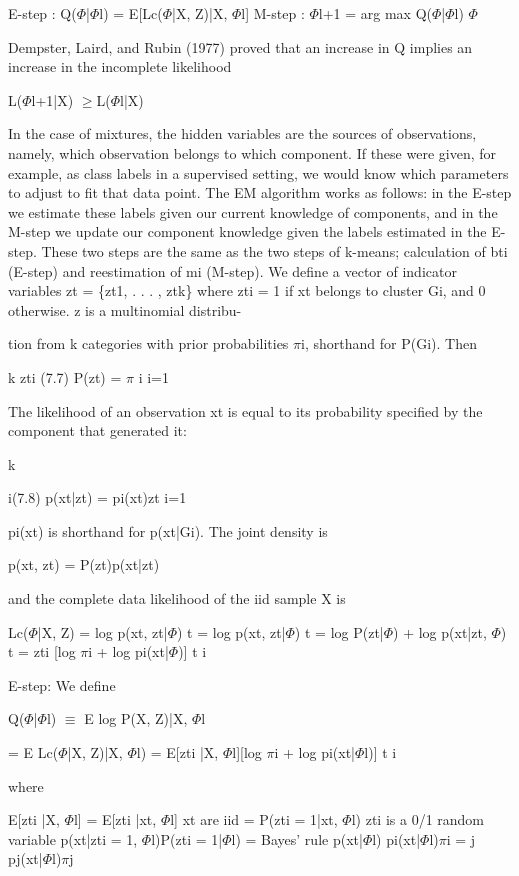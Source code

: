 E-step : Q($\Phi$|$\Phi$l) = E[Lc($\Phi$|X, Z)|X, $\Phi$l] M-step : $\Phi$l+1 = arg max Q($\Phi$|$\Phi$l) $\Phi$

Dempster, Laird, and Rubin (1977) proved that an increase in Q implies an increase in the incomplete likelihood

L($\Phi$l+1|X) $\geq$L($\Phi$l|X)

In the case of mixtures, the hidden variables are the sources of observations, namely, which observation belongs to which component. If these were given, for example, as class labels in a supervised setting, we would know which parameters to adjust to fit that data point. The EM algorithm works as follows: in the E-step we estimate these labels given our current knowledge of components, and in the M-step we update our component knowledge given the labels estimated in the E-step. These two steps are the same as the two steps of k-means; calculation of bti (E-step) and reestimation of mi (M-step). We define a vector of indicator variables zt = \{zt1, . . . , ztk\} where zti = 1 if xt belongs to cluster Gi, and 0 otherwise. z is a multinomial distribu-

tion from k categories with prior probabilities $\pi$i, shorthand for P(Gi). Then

k zti (7.7) P(zt) = $\pi$ i i=1

The likelihood of an observation xt is equal to its probability specified by the component that generated it:

k

i(7.8) p(xt|zt) = pi(xt)zt i=1

pi(xt) is shorthand for p(xt|Gi). The joint density is

p(xt, zt) = P(zt)p(xt|zt)

and the complete data likelihood of the iid sample X is

Lc($\Phi$|X, Z) = log p(xt, zt|$\Phi$) t = log p(xt, zt|$\Phi$) t = log P(zt|$\Phi$) + log p(xt|zt, $\Phi$) t = zti [log $\pi$i + log pi(xt|$\Phi$)] t i

E-step: We define

Q($\Phi$|$\Phi$l) $\equiv$ E log P(X, Z)|X, $\Phi$l

= E Lc($\Phi$|X, Z)|X, $\Phi$l) = E[zti |X, $\Phi$l][log $\pi$i + log pi(xt|$\Phi$l)] t i

where

E[zti |X, $\Phi$l] = E[zti |xt, $\Phi$l] xt are iid = P(zti = 1|xt, $\Phi$l) zti is a 0/1 random variable p(xt|zti = 1, $\Phi$l)P(zti = 1|$\Phi$l) = Bayes’ rule p(xt|$\Phi$l) pi(xt|$\Phi$l)$\pi$i = j pj(xt|$\Phi$l)$\pi$j

